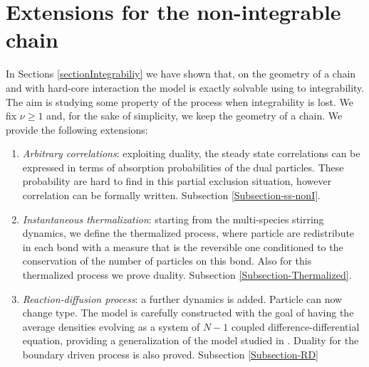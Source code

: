 \documentclass[10pt]{article}
\numberwithin{equation}{section}
\numberwithin{equation}{subsection}
\begin{document}
\section{Extensions for the non-integrable chain}
In Sections \ref{sectionIntegrabiliy} we have shown that, on the geometry of a chain and with hard-core interaction the model is exactly solvable using to integrability.  
The aim is studying some property of the process when integrability is lost. We fix $\nu\geq 1$ and, for the sake of simplicity, we keep the geometry of a chain. We provide the following extensions: 
\begin{enumerate}
	\item \textit{Arbitrary correlations}: exploiting duality, the steady state correlations can be expressed in terms of absorption probabilities of the dual particles. These probability are hard to find in this partial exclusion situation, however correlation can be formally written. Subsection \ref{Subsection-ss-nonI}.
	\item \textit{Instantaneous thermalization}: starting from the multi-species stirring dynamics, we define the thermalized process, where particle are redistribute in each bond with a measure that is the reversible one conditioned to the conservation of the number of particles on this bond. Also for this thermalized process we prove duality. Subsection \ref{Subsection-Thermalized}.
	\item \textit{Reaction-diffusion process}: a further dynamics is added. Particle can now change type. The model is carefully constructed with the goal of having the average densities evolving as a system of $N-1$ coupled difference-differential equation, providing a generalization of the model studied in \cite{casini2022uphill}. Duality for the boundary driven process is also proved. Subsection \ref{Subsection-RD}
\end{enumerate}
\end{document}
